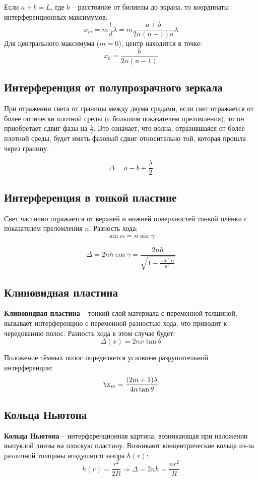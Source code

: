 \documentclass[12pt]{article}
\begin{document}
Если $a + b = L$, где $b$ -- расстояние от билинзы до экрана, то координаты интерференционных максимумов:
\[
x_m = m \frac{l}{d} \lambda = m \frac{a + b}{2 \alpha (n - 1) a} \lambda
\]
Для центрального максимума ($m = 0$), центр находится в точке:
\[
x_0 = \frac{b}{2 \alpha (n - 1)}
\]


\subsection{Интерференция от полупрозрачного зеркала}

При отражении света от границы между двумя средами, если свет отражается от более оптически плотной среды (с большим показателем преломления), то он приобретает сдвиг фазы на $\frac{\lambda}{2}$. Это означает, что волна, отразившаяся от более плотной среды, будет иметь фазовый сдвиг относительно той, которая прошла через границу.

\[
\Delta = a - b + \frac{\lambda}{2}
\]

\subsection{Интерференция в тонкой пластине}

Свет частично отражается от верхней и нижней поверхностей тонкой плёнки с показателем преломления $n$. Разность хода:
\[
\sin \alpha = n \sin \gamma
\]

\[
\Delta = 2nh\cos \gamma = \frac{2nh}{\sqrt{1 - \frac{\sin^2 \alpha}{n^2}}}
\]

\subsection{Клиновидная пластина}

\textbf{Клиновидная пластина} -- тонкий слой материала с переменной толщиной, вызывает интерференцию с переменной разностью хода, что приводит к чередованию полос. Разность хода в этом случае будет:
\[
\Delta(x) = 2n x \tan \theta
\]

Положение тёмных полос определяется условием разрушительной интерференции:
\[
\x_m = \frac{(2m + 1)\lambda}{4n \tan \theta}
\]

\subsection{Кольца Ньютона}

\textbf{Кольца Ньютона} -- интерференционная картина, возникающая при наложении выпуклой линзы на плоскую пластину. Возникают концентрические кольца из-за различной толщины воздушного зазора $h(r)$:
\[
h(r) = \frac{r^2}{2R} \Rightarrow \Delta = 2n h = \frac{n r^2}{R}
\]
\end{document}
